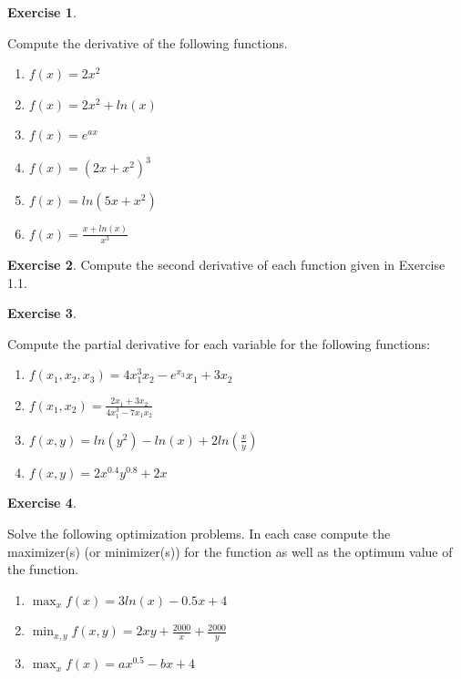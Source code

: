 \documentclass[
]{book}
\theoremstyle{definition}
\theoremstyle{definition}
\theoremstyle{definition}
\newtheorem{exercise}{Exercise}[chapter]
\theoremstyle{definition}
\theoremstyle{remark}
\begin{document}
\begin{exercise}
\protect\hypertarget{exr:unnamed-chunk-17}{}\label{exr:unnamed-chunk-17}

Compute the derivative of the following functions.

\begin{enumerate}
\def\labelenumi{\alph{enumi}.}
\item
  \(f(x)=2x^2\)
\item
  \(f(x)=2x^2+ ln(x)\)
\item
  \(f(x)=e^{ax}\)
\item
  \(f(x)= (2x+x^2)^3\)
\item
  \(f(x)= ln(5x+x^2)\)
\item
  \(f(x)= \displaystyle{\frac{x+ln(x)}{x^3}}\)
\end{enumerate}

\end{exercise}

\begin{exercise}
\protect\hypertarget{exr:unnamed-chunk-18}{}\label{exr:unnamed-chunk-18}Compute the second derivative of each function given in Exercise 1.1.
\end{exercise}

\begin{exercise}
\protect\hypertarget{exr:unnamed-chunk-19}{}\label{exr:unnamed-chunk-19}

Compute the partial derivative for each variable for the following functions:

\begin{enumerate}
\def\labelenumi{\alph{enumi}.}
\item
  \(f(x_1,x_2,x_3)=4x_1^3x_2-e^{x_3}x_1+3 x_2\)
\item
  \(\displaystyle{f(x_1,x_2)=\frac{2x_1 +3x_2}{4x_1^3-7x_1x_2}}\)
\item
  \(\displaystyle{f(x, y)= ln(y^2)-ln(x)+2 ln\left(\frac{x}{y}\right)}\)
\item
  \(f(x,y)=2x^{0.4} y^{0.8}+2x\)
\end{enumerate}

\end{exercise}

\begin{exercise}
\protect\hypertarget{exr:unnamed-chunk-20}{}\label{exr:unnamed-chunk-20}

Solve the following optimization problems. In each case compute the maximizer(s) (or minimizer(s)) for the function as well as the optimum value of the function.

\begin{enumerate}
\def\labelenumi{\alph{enumi}.}
\item
  \(\displaystyle{\max_x f(x) = 3ln(x) - 0.5x+4}\)
\item
  \(\displaystyle{\min_{x,y} f(x,y) = 2xy+\frac{2000}{x}+\frac{2000}{y}}\)
\item
  \(\displaystyle{\max_x f(x) = ax^{0.5} - bx+4}\)
\end{enumerate}

\end{exercise}
\end{document}
